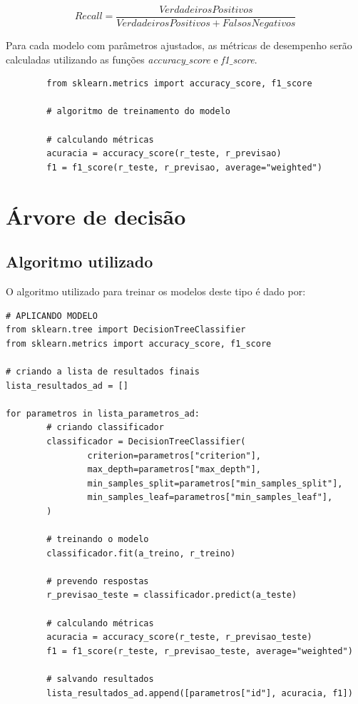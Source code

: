 \documentclass[12pt,a4paper]{article}
\begin{document}
\begin{equation*}
Recall = \frac{VerdadeirosPositivos}{VerdadeirosPositivos + FalsosNegativos} 
\end{equation*}

\vspace{0.5cm}
Para cada modelo com parâmetros ajustados, as métricas de desempenho serão calculadas utilizando as funções \textit{accuracy$\_$score} e \textit{f1$\_$score}.

\begin{mdframed}
	\begin{verbatim}
		from sklearn.metrics import accuracy_score, f1_score
		
		# algoritmo de treinamento do modelo

		# calculando métricas
		acuracia = accuracy_score(r_teste, r_previsao)
		f1 = f1_score(r_teste, r_previsao, average="weighted")
	\end{verbatim}
\end{mdframed}

\newpage
\section{Árvore de decisão}
\subsection{Algoritmo utilizado}

\quad\space O algoritmo utilizado para treinar os modelos deste tipo é dado por:

\begin{mdframed}
	\begin{verbatim}
# APLICANDO MODELO
from sklearn.tree import DecisionTreeClassifier
from sklearn.metrics import accuracy_score, f1_score

# criando a lista de resultados finais
lista_resultados_ad = []

for parametros in lista_parametros_ad:
		# criando classificador
		classificador = DecisionTreeClassifier(
				criterion=parametros["criterion"],
				max_depth=parametros["max_depth"],
				min_samples_split=parametros["min_samples_split"],
				min_samples_leaf=parametros["min_samples_leaf"],
		)
		
		# treinando o modelo
		classificador.fit(a_treino, r_treino)
		
		# prevendo respostas
		r_previsao_teste = classificador.predict(a_teste)
		
		# calculando métricas
		acuracia = accuracy_score(r_teste, r_previsao_teste)
		f1 = f1_score(r_teste, r_previsao_teste, average="weighted")
		
		# salvando resultados
		lista_resultados_ad.append([parametros["id"], acuracia, f1])
	\end{verbatim}
\end{mdframed}
\end{document}
